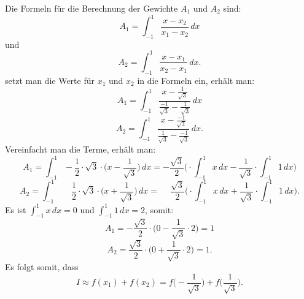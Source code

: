 Die Formeln für die Berechnung der Gewichte $A_{1}$ und $A_{2}$ sind:
\begin{equation*}
    A_{1} = \int_{-1}^{1} \frac{x - x_{2}}{x_{1} - x_{2}} \, dx
\end{equation*}
und
\begin{equation}
    A_{2} = \int_{-1}^{1} \frac{x - x_{1}}{x_{2} - x_{1}} \, dx.
\end{equation}
setzt man die Werte für $x_{1}$ und $x_{2}$ in die Formeln ein, erhält man:
\begin{equation*}
    A_{1} = \int_{-1}^{1} \frac{x - \frac{1}{\sqrt{3}}}{\frac{-1}{\sqrt{3}} - \frac{1}{\sqrt{3}}} \, dx
\end{equation*}
\begin{equation}
    A_{2} = \int_{-1}^{1} \frac{x - \frac{-1}{\sqrt{3}}}{\frac{1}{\sqrt{3}} - \frac{-1}{\sqrt{3}}} \, dx.
\end{equation}
Vereinfacht man die Terme, erhält man:
\begin{equation*}
    A_{1} 
    =
    \int_{-1}^{1} -\frac{1}{2} 
    \cdot \sqrt{3} 
    \cdot \bigg(x - \frac{1}{\sqrt{3}}\bigg)
    \, dx
    =
    -\frac{\sqrt{3}}{2} 
    \bigg(
    \cdot \int_{-1}^{1}x\,dx
    -
    \frac{1}{\sqrt{3}} 
    \cdot \int_{-1}^{1}1\,dx
    \bigg)
\end{equation*}
\begin{equation}
    A_{2} 
    =
    \int_{-1}^{1} \phantom{-}\frac{1}{2} 
    \cdot \sqrt{3}  
    \cdot \bigg(x + \frac{1}{\sqrt{3}}\bigg)
    \, dx
    =
    \phantom{-}
    \frac{\sqrt{3}}{2} 
    \bigg(
    \cdot \int_{-1}^{1}x\,dx
    +
    \frac{1}{\sqrt{3}} 
    \cdot \int_{-1}^{1}1\,dx
    \bigg).
\end{equation}
Es ist $\int_{-1}^{1}x\,dx = 0$ und $\int_{-1}^{1}1\,dx = 2$, somit:
\begin{equation*}
    A_{1} 
    =
    -\frac{\sqrt{3}}{2} 
    \cdot 
    \bigg( 0
    -
    \frac{1}{\sqrt{3}} 
    \cdot 2
    \bigg)
    =
    1
\end{equation*}
\begin{equation}
    A_{2} 
    =
    \frac{\sqrt{3}}{2} 
    \cdot
    \bigg( 0
    +
    \frac{1}{\sqrt{3}} 
    \cdot 2
    \bigg)
    = 
    1.
\end{equation}
Es folgt somit, dass
\begin{equation}
    I 
    \approx 
    f(x_{1})+f(x_{2}) 
    = 
    f\biggl(-\frac{1}{\sqrt{3}}\biggr)
    +
    f\biggl(\frac{1}{\sqrt{3}}\biggr).
\end{equation}


